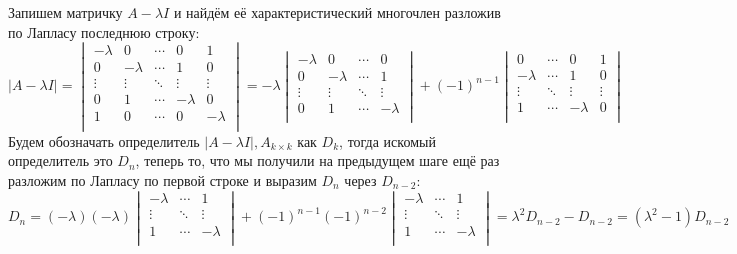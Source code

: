 \documentclass[12pt]{article} %
\begin{document}
\begin{enumerate}
    Запишем матричку $A - \lambda I$ и найдём её характеристический многочлен разложив по Лапласу последнюю строку: 
    \[
    |A - \lambda I| = 
    \begin{vmatrix}
        -\lambda & 0 & \cdots & 0 & 1\\
        0 & -\lambda & \cdots & 1 & 0\\
        \vdots & \vdots & \ddots & \vdots & \vdots \\
        0 & 1 & \cdots & -\lambda & 0\\
        1 & 0 & \cdots & 0 & -\lambda\\
    \end{vmatrix} = 
    -\lambda 
    \begin{vmatrix}
        -\lambda & 0 & \cdots & 0 \\
        0 & -\lambda & \cdots & 1 \\
        \vdots & \vdots & \ddots & \vdots  \\
        0 & 1 & \cdots & -\lambda \\
    \end{vmatrix}
     + (-1)^{n - 1}
     \begin{vmatrix}
          0 & \cdots & 0 & 1\\
         -\lambda & \cdots & 1 & 0\\
         \vdots & \ddots & \vdots & \vdots \\
         1 & \cdots & -\lambda & 0\\
     \end{vmatrix}
    \]
    Будем обозначать определитель $|A - \lambda I|, A_{k \times k}$ как $D_k$, тогда искомый определитель это $D_n$, теперь то, что мы получили на предыдущем шаге ещё раз разложим по Лапласу по первой строке и выразим $D_n$ через $D_{n - 2}$:
    \[
    D_n = (-\lambda)(-\lambda)
    \begin{vmatrix}
        -\lambda & \cdots & 1\\
        \vdots & \ddots & \vdots \\
        1 & \cdots & -\lambda\\
    \end{vmatrix}
     + (-1)^{n - 1}(-1)^{n - 2}
     \begin{vmatrix}
        -\lambda & \cdots & 1\\
        \vdots & \ddots & \vdots \\
        1 & \cdots & -\lambda\\
    \end{vmatrix}
     = \lambda^2 D_{n - 2} - D_{n - 2} = (\lambda^2 - 1)D_{n - 2}
\]
\end{enumerate}
\end{document}
